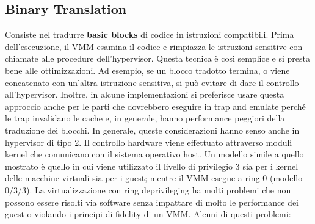 \documentclass[11pt,a4paper]{report}
\begin{document}
\subsection{Binary Translation}

Consiste nel tradurre \textbf{basic blocks} di codice in istruzioni compatibili. Prima dell'esecuzione, il VMM esamina il codice e rimpiazza le istruzioni sensitive con chiamate alle procedure dell'hypervisor. Questa tecnica è così semplice e si presta bene alle ottimizzazioni. Ad esempio, se un blocco tradotto termina, o viene concatenato con un'altra istruzione sensitiva, si può evitare di dare il controllo all'hypervisor. Inoltre, in alcune implementazioni si preferisce usare questa approccio anche per le parti che dovrebbero eseguire in trap and emulate perché le trap invalidano le cache e, in generale, hanno performance peggiori della traduzione dei blocchi. In generale, queste considerazioni hanno senso anche in hypervisor di tipo 2. Il controllo hardware viene effettuato attraverso moduli kernel che comunicano con il sistema operativo host. Un modello simile a quello mostrato è quello in cui viene utilizzato il livello di privilegio 3 sia per i kernel delle macchine virtuali sia per i guest; mentre il VMM esegue a ring 0 (modello 0/3/3). La virtualizzazione con ring deprivileging ha molti problemi che non possono essere risolti via software senza impattare di molto le performance dei guest o violando i principi di fidelity di un VMM. Alcuni di questi problemi:
\end{document}
